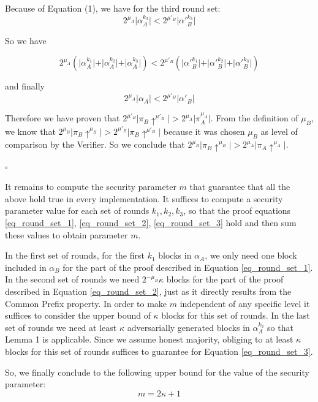 Because of Equation (1), we have for the third round set:
\begin{equation} \label{eq_round_set_3}
2^{\mu_A} \vert \alpha_A^{k_3} \vert < 2^{\mu'_B} \vert \alpha'{_B^{k_3}} \vert
\end{equation}

So we have

\begin{equation*}
2^{\mu_A} ( \vert \alpha_A^{k_1} \vert + \vert \alpha_A^{k_2} \vert + \vert
\alpha_A^{k_3} \vert ) < 2^{\mu'_B} ( \vert \alpha'{_B^{k_1}} \vert + \vert
\alpha'{_B^{k_2}} \vert + \vert \alpha'{_B^{k_3}} \vert)
\end{equation*}

and finally
\begin{equation}
2^{\mu_A} \vert \alpha_A \vert < 2^{\mu'_B} \vert \alpha'{_B} \vert
\end{equation}


Therefore we have proven that $2^{\mu'_B} \vert \pi_B \uparrow^{\mu'_B} \vert >
2^{\mu_A} \vert \pi_A^{\mu_A} \vert$. From the definition of $\mu_B$, we know
that $2^{\mu_B} \vert \pi_B \uparrow^{\mu_B} \vert > 2^{\mu'_B} \vert \pi_B
\uparrow^{\mu'_B} \vert$ because it was chosen $\mu_B$ as level of comparison
by the Verifier. So we conclude that $2^{\mu_B} \vert \pi_B \uparrow^{\mu_B}
\vert > 2^{\mu_A} \vert \pi_A \uparrow^{\mu_A} \vert$.

\begin{flushright}
$\square$
\end{flushright}

It remains to compute the security parameter $m$ that guarantee that all the above
hold true in every implementation. It suffices to compute a security parameter
value for each set of rounds $k_1, k_2, k_3$, so that the proof equations
\ref{eq_round_set_1}, \ref{eq_round_set_2}, \ref{eq_round_set_3} hold and
then sum these values to obtain parameter $m$.

In the first set of rounds, for the first $k_1$ blocks in $\alpha_A$, we only need
one block included in $\alpha_B$ for the part of the proof described in Equation
\ref{eq_round_set_1}. In the second set of rounds we need $2^{-\mu_B}\kappa$ blocks
for the part of the proof described in Equation \ref{eq_round_set_2}, just as it
directly results from the Common Prefix property. In order to make $m$ independent
of any specific level it suffices to consider the upper bound of $\kappa$ blocks
for this set of rounds. In the last set of rounds we need at least $\kappa$
adversarially generated blocks in $\alpha_A^{k_3}$ so that Lemma 1 is applicable.
Since we assume honest majority, obliging to at least $\kappa$ blocks for this
set of rounds suffices to guarantee for Equation \ref{eq_round_set_3}.

So, we finally conclude to the following upper bound for the value of the
 security parameter:
\begin{equation}
m = 2\kappa + 1
\end{equation}
 
